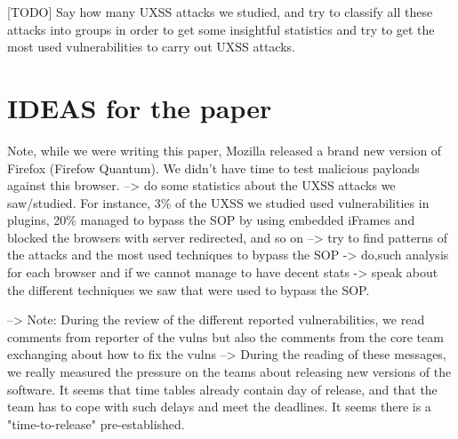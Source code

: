 \documentclass[journal]{IEEEtran}
\begin{document}
[TODO]
Say how many UXSS attacks we studied, and try to classify all these attacks into groups in order to get some insightful statistics and try to get the most used vulnerabilities to carry out UXSS attacks.



\section{IDEAS for the paper}
Note, while we were writing this paper, Mozilla released a brand new version of Firefox (Firefow Quantum). We didn't have time to test malicious payloads against this browser.
--> do some statistics about the UXSS attacks we saw/studied. For instance, 3\% of the UXSS we studied used vulnerabilities in plugins, 20\% managed to bypass the SOP by using embedded iFrames and blocked the browsers with server redirected, and so on --> try to find patterns of the attacks and the most used techniques to bypass the SOP -> do,such analysis for each browser and if we cannot manage to have decent stats -> speak about the different techniques we saw that were used to bypass the SOP.


--> Note: During the review of the different reported vulnerabilities, we read comments from reporter of the vulns but also the comments from the core team exchanging about how to fix the vulns --> During the reading of these messages, we really measured the pressure on the teams about releasing new versions of the software. It seems that time tables already contain day of release, and that the team has to cope with such delays and meet the deadlines. It seems there is a "time-to-release" pre-established.  


%
\end{document}
